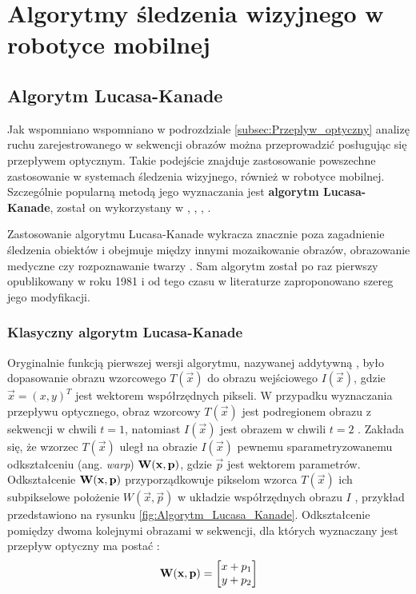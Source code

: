 \chapter{Algorytmy śledzenia wizyjnego w robotyce mobilnej}
\label{cha:Algorymty_sledzenia_wizyjnego_w_robotyce_mobilnej}

\section{Algorytm Lucasa-Kanade}
\label{sec:Algorytm_Lucasa_Kanade}
Jak wspomniano wspomniano w podrozdziale \ref{subsec:Przeplyw_optyczny} analizę ruchu zarejestrowanego w sekwencji obrazów można przeprowadzić posługując się przepływem optycznym. Takie podejście znajduje zastosowanie powszechne zastosowanie w systemach śledzenia wizyjnego, również w robotyce mobilnej. Szczególnie popularną metodą jego wyznaczania jest \textbf{algorytm Lucasa-Kanade}, został on wykorzystany w \cite{Markovic2014}, \cite{Sadeghi-Tehran2014}, \cite{Fernandez-Caballero2010}, \cite{Liem2008}.

Zastosowanie algorytmu Lucasa-Kanade wykracza znacznie poza zagadnienie śledzenia obiektów i obejmuje między innymi mozaikowanie obrazów, obrazowanie medyczne czy rozpoznawanie twarzy \cite{Baker2004}. Sam algorytm został po raz pierwszy opublikowany w roku 1981 i od tego czasu w literaturze zaproponowano szereg jego modyfikacji.

\subsection{Klasyczny algorytm Lucasa-Kanade}
\label{subsec:Klasyczny_algorytm_Lucasa_Kanade}

Oryginalnie funkcją pierwszej wersji algorytmu, nazywanej addytywną \cite{Baker2004}, było dopasowanie obrazu wzorcowego $T(\vec{x})$ do obrazu wejściowego $I(\vec{x})$, gdzie $\vec{x} = (x, y)^T$ jest wektorem współrzędnych pikseli. W przypadku wyznaczania przepływu optycznego, obraz wzorcowy $T(\vec{x})$ jest podregionem obrazu z sekwencji w chwili $t = 1$, natomiast $I(\vec{x})$ jest obrazem w chwili $t = 2$ \cite{Baker2004}. Zakłada się, że wzorzec $T(\vec{x})$ uległ na obrazie $I(\vec{x})$ pewnemu sparametryzowanemu odkształceniu (ang. \textit{warp}) $\mathbf{W}(\mathbf{x}, \mathbf{p})$, gdzie $\vec{p}$ jest wektorem parametrów. Odkształcenie $\mathbf{W}(\mathbf{x}, \mathbf{p})$ przyporządkowuje pikselom wzorca $T(\vec{x})$ ich subpikselowe położenie $W(\vec{x}, \vec{p})$ w układzie współrzędnych obrazu $I$  \cite{Baker2004}, przykład przedstawiono na rysunku \ref{fig:Algorytm_Lucasa_Kanade}. Odkształcenie pomiędzy dwoma kolejnymi obrazami w sekwencji, dla których wyznaczany jest przepływ optyczny ma postać \cite{Baker2004}:
\begin{equation}
\label{equ:Odksztalcenie_przeplyw_optyczny}
	\mathbf{W}(\mathbf{x}, \mathbf{p}) = \begin{bmatrix}
		x + p_1 \\
		y + p_2 \\
	\end{bmatrix}
\end{equation}

